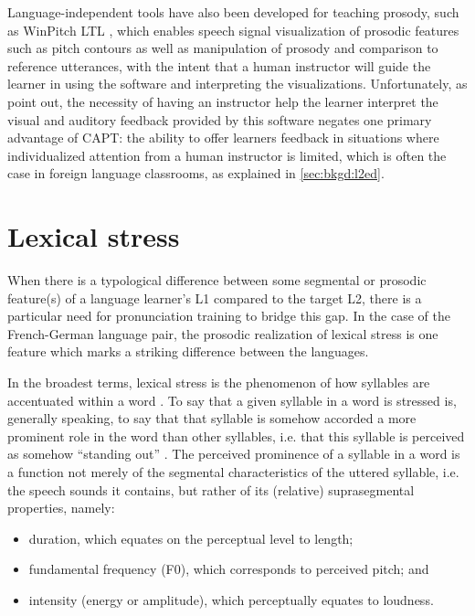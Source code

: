 	Language-independent tools have also been developed for teaching prosody, such as WinPitch LTL \citep{Martin2004}, which enables speech signal visualization of prosodic features such as pitch contours as well as manipulation of prosody and comparison to reference utterances, with the intent that a human instructor will guide the learner in using the software and interpreting the visualizations. Unfortunately, as \textcite{Neri2002} point out, the necessity of having an instructor help the learner interpret the visual and auditory feedback provided by this software negates one primary advantage of CAPT:
	the ability to offer learners feedback in situations where individualized attention from a human instructor is limited, which is often the case in foreign language classrooms, as explained in  \cref{sec:bkgd:l2ed}.
	
	
	
	
 \section{Lexical stress}
 \label{sec:bkgd:stress}
		When there is a typological difference between some segmental or prosodic feature(s) of a language learner's L1 compared to the target L2, there is a particular need for pronunciation training to bridge this gap. In the case of the French-German language pair, the prosodic realization of lexical stress is one feature which marks a striking difference between the languages.
		
			In the broadest terms, lexical stress is the phenomenon of how syllables are accentuated within a word  \citep{Cutler2005}. To say that a given syllable in a word is stressed is, generally speaking, to say that that syllable is somehow accorded a more prominent role in the word than other syllables, i.e. that this syllable is perceived as somehow ``standing out'' \citep{Dogil1999}.
			The perceived prominence of a syllable in a word is a function not merely of the segmental characteristics of the uttered syllable, i.e. the speech sounds it contains, but rather of its (relative) suprasegmental properties, namely: %
			\begin{itemize}
			\item duration, which equates on the perceptual level to length; %
			\item fundamental frequency (F0), which corresponds to perceived pitch; and
			\item intensity (energy or amplitude), which perceptually equates to loudness.
			\end{itemize}

